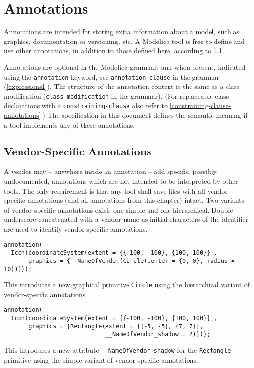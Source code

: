 \chapter{Annotations}\label{annotations}

Annotations are intended for storing extra information about a model, such as graphics, documentation or versioning, etc.
A Modelica tool is free to define and use other annotations, in addition to those defined here, according to \cref{vendor-specific-annotations}.

Annotations are optional in the Modelica grammar, and when present, indicated using the \lstinline!annotation! keyword, see \lstinline[language=grammar]!annotation-clause! in the grammar (\cref{expressions1}).
The structure of the annotation content is the same as a class modification (\lstinline[language=grammar]!class-modification! in the grammar).
(For replaceable class declarations with a \lstinline[language=grammar]!constraining-clause! also refer to \cref{constraining-clause-annotations}.)
The specification in this document defines the semantic meaning if a tool implements any of these annotations.

\section{Vendor-Specific Annotations}\label{vendor-specific-annotations}

A vendor may -- anywhere inside an annotation -- add specific, possibly undocumented, annotations which are not intended to be interpreted by other tools.
The only requirement is that any tool shall save files with all vendor-specific annotations (and all annotations from this chapter) intact.
Two variants of vendor-specific annotations exist; one simple and one hierarchical.
Double underscore concatenated with a vendor name as initial characters of the identifier are used to identify vendor-specific annotations.

\begin{example}
\begin{lstlisting}[language=modelica]
annotation(
  Icon(coordinateSystem(extent = {{-100, -100}, {100, 100}}),
       graphics = {__NameOfVendor(Circle(center = {0, 0}, radius = 10))}));
\end{lstlisting}
This introduces a new graphical primitive \lstinline!Circle! using the hierarchical variant of vendor-specific annotations.
\begin{lstlisting}[language=modelica]
annotation(
  Icon(coordinateSystem(extent = {{-100, -100}, {100, 100}}),
       graphics = {Rectangle(extent = {{-5, -5}, {7, 7}},
                             __NameOfVendor_shadow = 2)}));
\end{lstlisting}
This introduces a new attribute \lstinline!__NameOfVendor_shadow! for the \lstinline!Rectangle! primitive using the simple variant of vendor-specific annotations.
\end{example}

